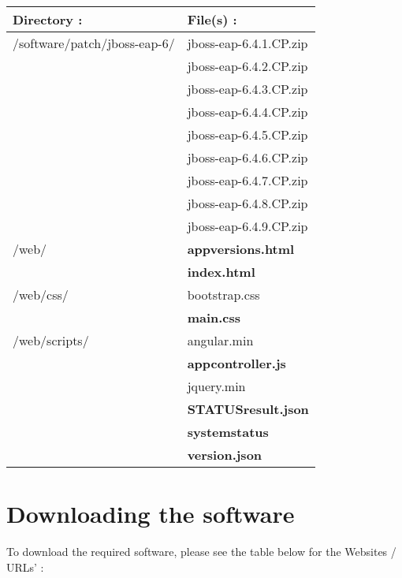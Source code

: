 \begin{center}
	\begin{tabular}{|p{2in}|p{4in}|}
	\hline
	\textbf{Directory :} & \textbf{File(s) :}\\
	\hline
	/software/patch/jboss-eap-6/ & jboss-eap-6.4.1.CP.zip\\
	& jboss-eap-6.4.2.CP.zip\\
	& jboss-eap-6.4.3.CP.zip\\
	& jboss-eap-6.4.4.CP.zip\\
	& jboss-eap-6.4.5.CP.zip\\
	& jboss-eap-6.4.6.CP.zip\\
	& jboss-eap-6.4.7.CP.zip\\
	& jboss-eap-6.4.8.CP.zip\\
	& jboss-eap-6.4.9.CP.zip\\
	\hline
	/web/ & \textbf{appversions.html}\\
	& \textbf{index.html}\\
	/web/css/ & bootstrap.css\\
	& \textbf{main.css}\\
	/web/scripts/ & angular.min\\
	& \textbf{appcontroller.js}\\
	& jquery.min\\
	& \textbf{STATUSresult.json}\\
	& \textbf{systemstatus}\\
	& \textbf{version.json}\\
	\hline
	\end{tabular}
\end{center}

\chapter{Downloading the software}

\begin{myindent}
To download the required software, please see the table below for the Websites / URLs' :
\end{myindent}

